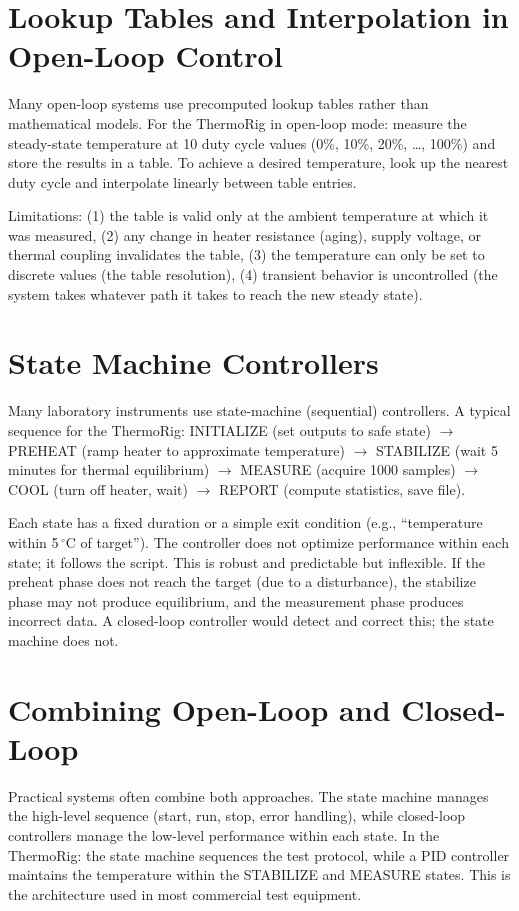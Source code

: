 \documentclass[11pt,letterpaper,twoside,openany]{book}
\newcommand{\degC}{\ensuremath{{}^{\circ}\text{C}}}
\begin{document}
\section{Lookup Tables and Interpolation in Open-Loop Control}
Many open-loop systems use precomputed lookup tables rather than mathematical models. For the ThermoRig in open-loop mode: measure the steady-state temperature at 10 duty cycle values (0\%, 10\%, 20\%, \ldots, 100\%) and store the results in a table. To achieve a desired temperature, look up the nearest duty cycle and interpolate linearly between table entries.

Limitations: (1) the table is valid only at the ambient temperature at which it was measured, (2) any change in heater resistance (aging), supply voltage, or thermal coupling invalidates the table, (3) the temperature can only be set to discrete values (the table resolution), (4) transient behavior is uncontrolled (the system takes whatever path it takes to reach the new steady state).

\section{State Machine Controllers}
Many laboratory instruments use state-machine (sequential) controllers. A typical sequence for the ThermoRig: INITIALIZE (set outputs to safe state) $\to$ PREHEAT (ramp heater to approximate temperature) $\to$ STABILIZE (wait 5 minutes for thermal equilibrium) $\to$ MEASURE (acquire 1000 samples) $\to$ COOL (turn off heater, wait) $\to$ REPORT (compute statistics, save file).

Each state has a fixed duration or a simple exit condition (e.g., ``temperature within 5\,\degC{} of target''). The controller does not optimize performance within each state; it follows the script. This is robust and predictable but inflexible. If the preheat phase does not reach the target (due to a disturbance), the stabilize phase may not produce equilibrium, and the measurement phase produces incorrect data. A closed-loop controller would detect and correct this; the state machine does not.

\section{Combining Open-Loop and Closed-Loop}
Practical systems often combine both approaches. The state machine manages the high-level sequence (start, run, stop, error handling), while closed-loop controllers manage the low-level performance within each state. In the ThermoRig: the state machine sequences the test protocol, while a PID controller maintains the temperature within the STABILIZE and MEASURE states. This is the architecture used in most commercial test equipment.
\end{document}
